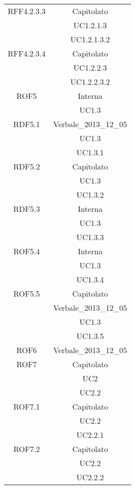 \begin{longtable}{|c|c|}
\midrule
RFF4.2.3.3
& Capitolato\\
& UC1.2.1.3\\
& UC1.2.1.3.2\\

\midrule
RFF4.2.3.4
& Capitolato\\
& UC1.2.2.3\\
& UC1.2.2.3.2\\

\midrule
ROF5
& Interna\\
& UC1.3\\

\midrule
RDF5.1
& Verbale\_2013\_12\_05\\
& UC1.3\\
& UC1.3.1\\

\midrule
RDF5.2
& Capitolato\\
& UC1.3\\
& UC1.3.2\\

\midrule
RDF5.3
& Interna\\
& UC1.3\\
& UC1.3.3\\

\midrule
ROF5.4
& Interna\\
& UC1.3\\
& UC1.3.4\\

\midrule
ROF5.5
& Capitolato\\
& Verbale\_2013\_12\_05\\
& UC1.3\\
& UC1.3.5\\


\midrule
ROF6
& Verbale\_2013\_12\_05\\

\midrule
ROF7
& Capitolato\\
& UC2\\
& UC2.2\\

\midrule
ROF7.1
& Capitolato\\
& UC2.2\\
& UC2.2.1\\

\midrule
ROF7.2
& Capitolato\\
& UC2.2\\
& UC2.2.2\\


\end{longtable}
